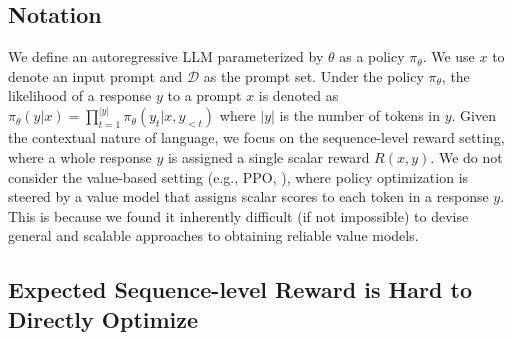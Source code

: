 \documentclass{article}
\begin{document}
\subsection{Notation}

We define an autoregressive LLM parameterized by \( \theta \) as a policy \( \pi_\theta \).
We use \(x\) to denote an input prompt and \( \mathcal{D} \) as the prompt set.
Under the policy \( \pi_\theta \), the likelihood of a response \(y\) to a prompt \(x\) is denoted as \( \pi_\theta (y | x)=\prod_{t=1}^{|y|} \pi_\theta (y_t | x, y_{<t} ) \) where \( |y| \) is the number of tokens in \(y\).
Given the contextual nature of language, we focus on the sequence-level reward setting, where a whole response \(y\) is assigned a single scalar reward \( R(x,y) \).
We do not consider the value-based setting (e.g., PPO, \citealt{ppo}), where policy optimization is steered by a value model that assigns scalar scores to each token in a response \(y\).
This is because we found it inherently difficult (if not impossible) to devise general and scalable approaches to obtaining reliable value models.

\subsection{Expected Sequence-level Reward is Hard to Directly Optimize}
\end{document}
